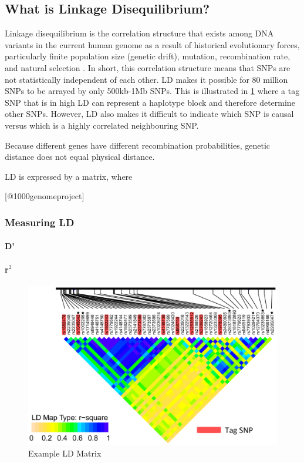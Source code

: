 \subsection{What is Linkage Disequilibrium?}

Linkage disequilibrium is the correlation structure that exists among DNA variants in the current human genome as a result of historical evolutionary forces, particularly finite population size (genetic drift), mutation, recombination rate, and natural selection \cite{Visscher2017}. In short, this correlation structure means that SNPs are not statistically independent of each other. LD makes it possible for 80 million SNPs to be arrayed by only 500kb-1Mb SNPs. This is illustrated in \ref{Sample LD Matrix} where a tag SNP that is in high LD can represent a haplotype block and therefore determine other SNPs.  However, LD also makes it difficult to indicate which SNP is causal versus which is a highly correlated neighbouring SNP. 

Because different genes have different recombination probabilities, genetic distance does not equal physical distance. 

LD is expressed by a matrix, where 

[@1000genomeproject]

\subsubsection{Measuring LD}
\paragraph{D'}

\paragraph{r$^2$}

\begin{figure}[H]
\centering
\includegraphics[scale=1.75]{images/LD_matrix.png}
\caption{Example LD Matrix}
\label{Sample LD Matrix}
\end{figure}

